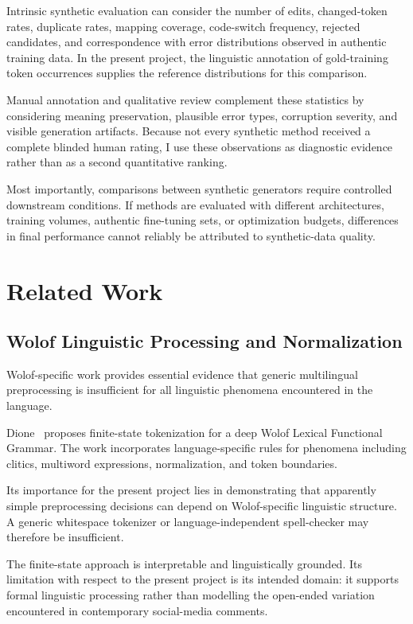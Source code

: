 \documentclass[12pt, a4paper, twoside, openany]{report}
\begin{document}
Intrinsic synthetic evaluation can consider the number of edits, changed-token rates, duplicate rates, mapping coverage, code-switch frequency, rejected candidates, and correspondence with error distributions observed in authentic training data. In the present project, the linguistic annotation of gold-training token occurrences supplies the reference distributions for this comparison.

Manual annotation and qualitative review complement these statistics by considering meaning preservation, plausible error types, corruption severity, and visible generation artifacts. Because not every synthetic method received a complete blinded human rating, I use these observations as diagnostic evidence rather than as a second quantitative ranking.

Most importantly, comparisons between synthetic generators require controlled downstream conditions. If methods are evaluated with different architectures, training volumes, authentic fine-tuning sets, or optimization budgets, differences in final performance cannot reliably be attributed to synthetic-data quality.


\section{Related Work}

\subsection{Wolof Linguistic Processing and Normalization}

Wolof-specific work provides essential evidence that generic multilingual preprocessing is insufficient for all linguistic phenomena encountered in the language.

Dione~\cite{dione2017tokenization} proposes finite-state tokenization for a deep Wolof Lexical Functional Grammar. The work incorporates language-specific rules for phenomena including clitics, multiword expressions, normalization, and token boundaries.

Its importance for the present project lies in demonstrating that apparently simple preprocessing decisions can depend on Wolof-specific linguistic structure. A generic whitespace tokenizer or language-independent spell-checker may therefore be insufficient.

The finite-state approach is interpretable and linguistically grounded. Its limitation with respect to the present project is its intended domain: it supports formal linguistic processing rather than modelling the open-ended variation encountered in contemporary social-media comments.
\end{document}
